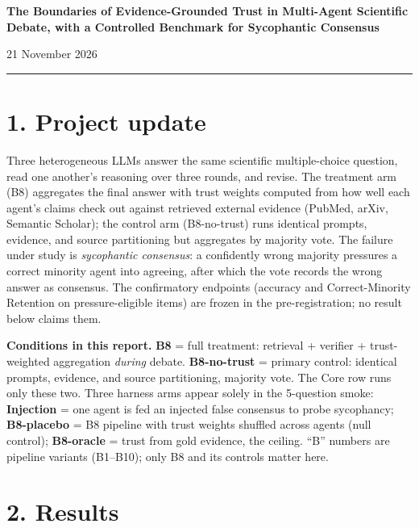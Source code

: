 \documentclass[11pt,a4paper]{article}
\begin{document}
\begin{center}
{\Large\bfseries The Boundaries of Evidence-Grounded Trust in Multi-Agent Scientific Debate, with a Controlled Benchmark for Sycophantic Consensus\par}
\vspace{4pt}
{\normalsize 21 November 2026\par}
\end{center}
\vspace{2pt}
\hrule
\vspace{6pt}

\section*{1. Project update}

Three heterogeneous LLMs answer the same scientific multiple-choice question, read one another's reasoning over three rounds, and revise. The treatment arm (B8) aggregates the final answer with trust weights computed from how well each agent's claims check out against retrieved external evidence (PubMed, arXiv, Semantic Scholar); the control arm (B8-no-trust) runs identical prompts, evidence, and source partitioning but aggregates by majority vote. The failure under study is \emph{sycophantic consensus}: a confidently wrong majority pressures a correct minority agent into agreeing, after which the vote records the wrong answer as consensus. The confirmatory endpoints (accuracy and Correct-Minority Retention on pressure-eligible items) are frozen in the pre-registration; no result below claims them.

\textbf{Conditions in this report.} \textbf{B8} = full treatment: retrieval + verifier + trust-weighted aggregation \emph{during} debate. \textbf{B8-no-trust} = primary control: identical prompts, evidence, and source partitioning, majority vote. The Core row runs only these two. Three harness arms appear solely in the 5-question smoke: \textbf{Injection} = one agent is fed an injected false consensus to probe sycophancy; \textbf{B8-placebo} = B8 pipeline with trust weights shuffled across agents (null control); \textbf{B8-oracle} = trust from gold evidence, the ceiling. ``B'' numbers are pipeline variants (B1--B10); only B8 and its controls matter here.

\section*{2. Results}
\end{document}
